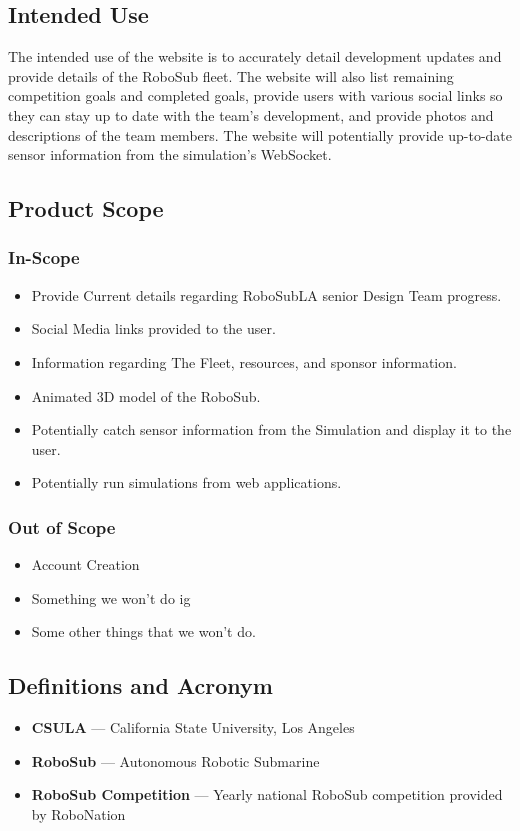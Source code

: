 \documentclass[12pt]{article}
\begin{document}
\subsection{Intended Use} 
The intended use of the website is to accurately detail development updates and provide details of the RoboSub fleet. The website will also list remaining competition goals and completed goals, provide users with various social links so they can stay up to date with the team's development, and provide photos and descriptions of the team members. The website will potentially provide up-to-date sensor information from the simulation's WebSocket. 

\subsection{Product Scope} 
\subsubsection{In-Scope} 
\begin{itemize}
	\item Provide Current details regarding RoboSubLA senior Design Team progress.
	\item Social Media links provided to the user.
	\item Information regarding The Fleet, resources, and sponsor information. 
	\item Animated 3D model of the RoboSub.
	\item Potentially catch sensor information from the Simulation and display it to the user. 
	\item Potentially run simulations from web applications. 
\end{itemize} 
\subsubsection{Out of Scope} 
\begin{itemize} 
	\item Account Creation
	\item Something we won't do ig 
	\item Some other things that we won't do. 
\end{itemize} 

\subsection{Definitions and Acronym} 
\begin{itemize}
	\item \textbf{CSULA} — California State University, Los Angeles 
	\item \textbf{RoboSub} — Autonomous Robotic Submarine 
	\item \textbf{RoboSub Competition} — Yearly national RoboSub competition provided by RoboNation
\end{itemize} 
\end{document}
